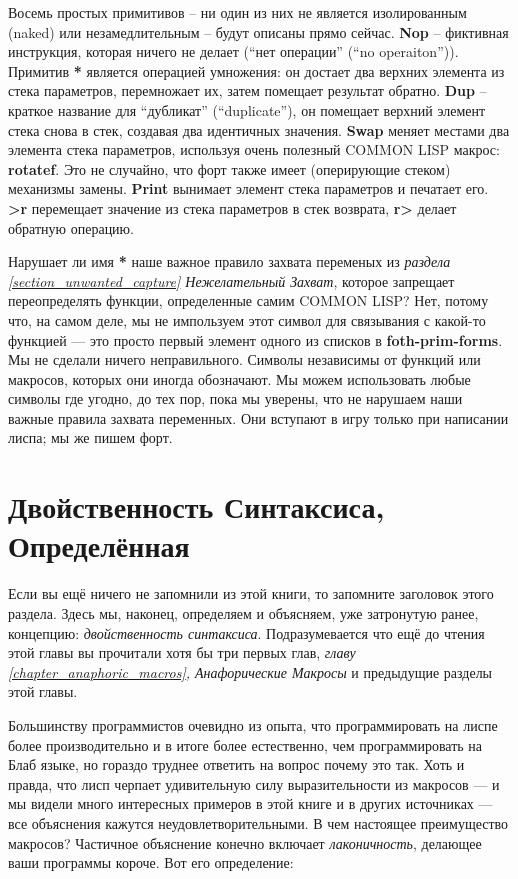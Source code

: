 Восемь простых примитивов -- ни один из них не является изолированным (naked) или незамедлительным -- будут описаны прямо сейчас. \textbf{Nop} -- фиктивная инструкция, которая ничего не делает (``нет операции'' (``no operaiton'')). Примитив \textbf{*} является операцией умножения: он достает два верхних элемента из стека параметров, перемножает их, затем помещает результат обратно. \textbf{Dup} -- краткое название для ``дубликат'' (``duplicate''), он помещает верхний элемент стека снова в стек, создавая два идентичных значения. \textbf{Swap} меняет местами два элемента стека параметров, используя очень полезный COMMON LISP макрос: \textbf{rotatef}. Это не случайно, что форт также имеет (оперирующие стеком) механизмы замены. \textbf{Print} вынимает элемент стека параметров и печатает его. \textbf{>r} перемещает значение из стека параметров в стек возврата, \textbf{r>} делает обратную операцию.

Нарушает ли имя \textbf{*} наше важное правило захвата переменых из \emph{раздела \ref{section_unwanted_capture} Нежелательный Захват}, которое запрещает переопределять функции, определенные самим COMMON LISP? Нет, потому что, на самом деле, мы не импользуем этот символ для связывания с какой-то функцией --- это просто первый элемент одного из списков в \textbf{foth-prim-forms}. Мы не сделали ничего неправильного. Символы независимы от функций или макросов, которых они иногда обозначают. Мы можем использовать любые символы где угодно, до тех пор, пока мы уверены, что не нарушаем наши важные правила захвата переменных. Они вступают в игру только при написании лиспа; мы же пишем форт.

\section{Двойственность Синтаксиса, Определённая}\label{section_duality_of_syntax_defined}

Если вы ещё ничего не запомнили из этой книги, то запомните заголовок этого раздела. Здесь мы, наконец, определяем и объясняем, уже затронутую ранее, концепцию: \emph{двойственность синтаксиса}. Подразумевается что ещё до чтения этой главы вы прочитали хотя бы три первых глав, \emph{главу \ref{chapter_anaphoric_macros}, Анафорические Макросы} и предыдущие разделы этой главы.

Большинству программистов очевидно из опыта, что программировать на лиспе более производительно и в итоге более естественно, чем программировать на Блаб языке, но гораздо труднее ответить на вопрос почему это так. Хоть и правда, что лисп черпает удивительную силу выразительности из макросов --- и мы видели много интересных примеров в этой книге и в других источниках --- все объяснения кажутся неудовлетворительными. В чем настоящее преимущество макросов? Частичное объяснение конечно включает \emph{лаконичность}, делающее ваши программы короче. Вот его определение:

